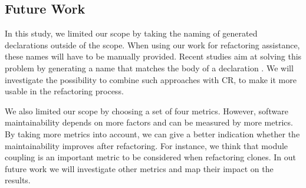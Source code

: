 \documentclass[sigconf,review,anonymous]{acmart}
\begin{document}
\subsection{Future Work}
In this study, we limited our scope by taking the naming of generated declarations outside of the scope. When using our work for refactoring assistance, these names will have to be manually provided. Recent studies aim at solving this problem by generating a name that matches the body of a declaration \cite{allamanis2015suggesting, alon2018code2seq}. We will investigate the possibility to combine such approaches with CR, to make it more usable in the refactoring process.

We also limited our scope by choosing a set of four metrics. However, software maintainability depends on more factors and can be measured by more metrics. By taking more metrics into account, we can give a better indication whether the maintainability improves after refactoring. For instance, we think that module coupling \cite{heitlager2007practical} is an important metric to be considered when refactoring clones. In out future work we will investigate other metrics and map their impact on the results.



\end{document}
